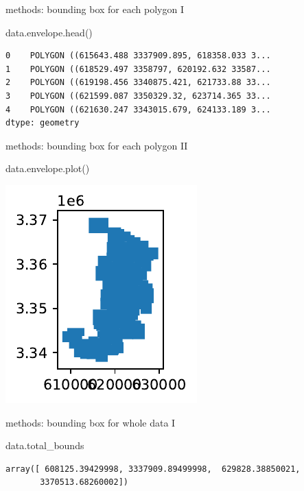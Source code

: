 \documentclass[
  ignorenonframetext,
]{beamer}
\newenvironment{Shaded}{\begin{snugshade}}{\end{snugshade}}
\newcommand{\NormalTok}[1]{\textcolor[rgb]{0.00,0.23,0.31}{#1}}
\begin{document}
\begin{frame}[fragile]{methods: bounding box for each polygon I}
\label{methods-bounding-box-for-each-polygon-i}
\begin{Shaded}
\begin{Highlighting}[]
\NormalTok{data.envelope.head()}
\end{Highlighting}
\end{Shaded}

\begin{verbatim}
0    POLYGON ((615643.488 3337909.895, 618358.033 3...
1    POLYGON ((618529.497 3358797, 620192.632 33587...
2    POLYGON ((619198.456 3340875.421, 621733.88 33...
3    POLYGON ((621599.087 3350329.32, 623714.365 33...
4    POLYGON ((621630.247 3343015.679, 624133.189 3...
dtype: geometry
\end{verbatim}
\end{frame}

\begin{frame}[fragile]{methods: bounding box for each polygon II}
\label{methods-bounding-box-for-each-polygon-ii}
\begin{Shaded}
\begin{Highlighting}[]
\NormalTok{data.envelope.plot()}
\end{Highlighting}
\end{Shaded}

\includegraphics{spatial_2_files/figure-beamer/cell-21-output-1.pdf}
\end{frame}

\begin{frame}[fragile]{methods: bounding box for whole data I}
\label{methods-bounding-box-for-whole-data-i}
\scriptsize

\begin{Shaded}
\begin{Highlighting}[]
\NormalTok{data.total\_bounds}
\end{Highlighting}
\end{Shaded}

\begin{verbatim}
array([ 608125.39429998, 3337909.89499998,  629828.38850021,
       3370513.68260002])
\end{verbatim}

\normalsize
\end{frame}
\end{document}
